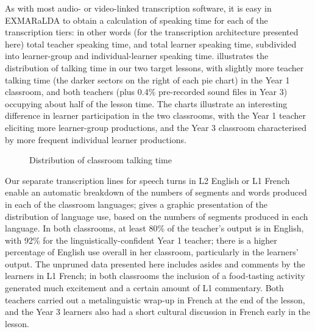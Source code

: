 \documentclass[output=paper,colorlinks,citecolor=brown,modfonts,nonflat]{../langscibook}
\begin{document}
As with most audio- or video-linked transcription software, it is easy in EXMARaLDA to obtain a calculation of speaking time for each of the transcription tiers: in other words (for the transcription architecture presented here) total teacher speaking time, and total learner speaking time, subdivided into learner-group and individual-learner speaking time.  illustrates the distribution of talking time in our two target lessons, with slightly more teacher talking time (the darker sectors on the right of each pie chart) in the Year 1 classroom, and both teachers (plus 0.4\% pre-recorded sound files in Year 3) occupying about half of the lesson time. The charts illustrate an interesting difference in learner participation in the two classrooms, with the Year 1 teacher eliciting more learner-group productions, and the Year 3 classroom characterised by more frequent individual learner productions.

\begin{figure}
\caption{\label{fig:hilton:2}Distribution of classroom talking time}
\end{figure}

Our separate transcription lines for speech turns in L2 English or L1 French enable an automatic breakdown of the numbers of segments and words produced in each of the classroom languages;  gives a graphic presentation of the distribution of language use, based on the numbers of segments produced in each language. In both classrooms, at least 80\% of the teacher’s output is in English, with 92\% for the linguistically-confident Year 1 teacher; there is a higher percentage of English use overall in her classroom, particularly in the learners’ output. The unpruned data presented here includes asides and comments by the learners in L1 French; in both classrooms the inclusion of a food-tasting activity generated much excitement and a certain amount of L1 commentary. Both teachers carried out a metalinguistic wrap-up in French at the end of the lesson, and the Year 3 learners also had a short cultural discussion in French early in the lesson.
\end{document}
